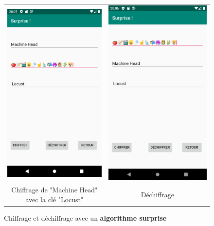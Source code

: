 \documentclass{article}
\begin{document}
\begin{figure}[b!]
    \centering
    \begin{tabular}{cc}
      \includegraphics[width=.35\linewidth]{./img/surprise_e.png} &
      \includegraphics[width=.35\linewidth]{./img/surprise_d.png} \\
      Chiffrage de "Machine Head" avec la clé "Locust" & Déchiffrage \\
    \end{tabular}
    \caption{Chiffrage et déchiffrage avec un \textbf{algorithme surprise}}\label{fig:surprise}
\end{figure}
\end{document}
